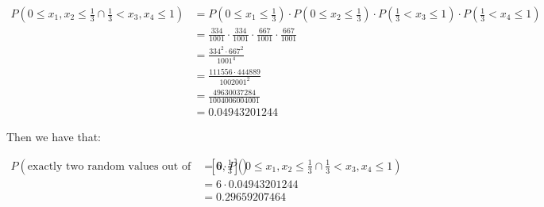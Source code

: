 \begin{equation*}
    \begin{split}
        P(0 \leq x_1, x_2 \leq \frac{1}{3} \cap \frac{1}{3} < x_3, x_4 \leq1) & =P(0 \leq x_1 \leq \frac{1}{3}) \cdot P(0 \leq x_2 \leq \frac{1}{3}) \cdot P(\frac{1}{3} < x_3 \leq1) \cdot P(\frac{1}{3} < x_4 \leq1) \\
                                                                              & =\frac{334}{1001} \cdot \frac{334}{1001} \cdot \frac{667}{1001} \cdot \frac{667}{1001}                                                 \\
                                                                              & =\frac{334^2 \cdot 667^2}{1001^4}                                                                                                      \\
                                                                              & =\frac{111556\cdot 444889}{1002001^2}                                                                                                  \\
                                                                              & =\frac{49630037284}{1004006004001}                                                                                                     \\
                                                                              & =0.04943201244
    \end{split}
\end{equation*}

Then we have that:

\begin{equation*}
    \begin{split}
        P(\text{exactly two random values out of four are in } [0, \frac{1}{3}]) & = 6 \cdot P(0 \leq x_1, x_2 \leq \frac{1}{3} \cap \frac{1}{3} < x_3, x_4 \leq1) \\
                                                                                 & = 6 \cdot 0.04943201244                                                         \\
                                                                                 & = 0.29659207464
    \end{split}
\end{equation*}